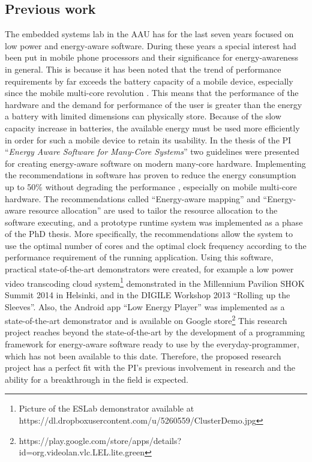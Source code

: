 \documentclass{article}
\begin{document}
\subsection{Previous work}
The embedded systems lab in the AAU has for the last seven years focused on low power and energy-aware software. 
During these years a special interest had been put in mobile phone processors and their significance for energy-awareness in general. 
This is because it has been noted that the trend of performance requirements by far exceeds the battery capacity of a mobile device, especially since the mobile multi-core revolution \cite{BatteryCapacity,CPUCapacity}. 
This means that the performance of the hardware and the demand for performance of the user is greater than the energy a battery with limited dimensions can physically store. 
Because of the slow capacity increase in batteries, the available energy must be used more efficiently in order for such a mobile device to retain its usability.
In the thesis of the PI ``\textit{Energy Aware Software for Many-Core Systems}'' two guidelines were presented for creating energy-aware software on modern many-core hardware. 
Implementing the recommendations in software has proven to reduce the energy consumption up to 50\% without degrading the performance \cite{HolmbackaHipeac}, especially on mobile multi-core hardware. 
The recommendations called ``Energy-aware mapping'' and ``Energy-aware resource allocation'' are used to tailor the resource allocation to the software executing, 
and a prototype runtime system was implemented as a phase of the PhD thesis.
More specifically, the recommendations allow the system to use the optimal number of cores and the optimal clock frequency according to the performance requirement of the running application.
Using this software, practical state-of-the-art demonstrators were created, for example a low power video transcoding cloud system\footnote{Picture of the ESLab demonstrator available at https://dl.dropboxusercontent.com/u/5260559/ClusterDemo.jpg} demonstrated in the Millennium Pavilion SHOK Summit 2014 in Helsinki, and in the DIGILE Workshop 2013 ``Rolling up the Sleeves''.
Also, the Android app ``Low Energy Player'' was implemented as a state-of-the-art demonstrator and is available on Google store\footnote{https://play.google.com/store/apps/details?id=org.videolan.vlc.LEL.lite.green}
This research project reaches beyond the state-of-the-art by the development of a programming framework for energy-aware software ready to use by the everyday-programmer, 
which has not been available to this date.
Therefore, the proposed research project has a perfect fit with the PI's previous involvement in research and the ability for a breakthrough in the field is expected.
\end{document}
